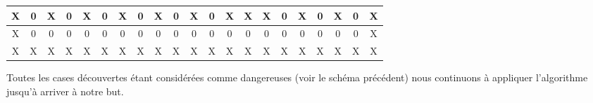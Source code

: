 \begin{center}
\begin{tabular}{|c|c|c|c|c|c|c|c|c|c|c|c|c|c|c|c|c|c|c|c|c|}
				\cellcolor{cyan}X & 0 & \cellcolor{cyan}X & 0 & \cellcolor{cyan}X & 0 & \cellcolor{cyan}X & 0 & \cellcolor{cyan}X & 0 & \cellcolor{cyan}X & 0 & \cellcolor{cyan}X & \cellcolor{cyan}X & \cellcolor{cyan}X & 0 & \cellcolor{cyan}X & 0 & \cellcolor{cyan}X & 0 & \cellcolor{cyan}X \\\hline
				\cellcolor{cyan}X & 0 & 0 & 0 & 0 & 0 & 0 & 0 & 0 & 0 & 0 & 0 & 0 & 0 & 0 & 0 & 0 & 0 & 0 & 0 &
				\cellcolor{cyan}X \\\hline \rowcolor{cyan}X & X & X & X & X & X & X & X & X & X & X & X & X & X & X & X & X & X & X & X & X \\\hline
				\end{tabular}
			\end{center}
			
			
			Toutes les cases découvertes étant considérées comme dangereuses (voir le schéma précédent) nous continuons à appliquer l'algorithme jusqu'à arriver à notre but.
			
